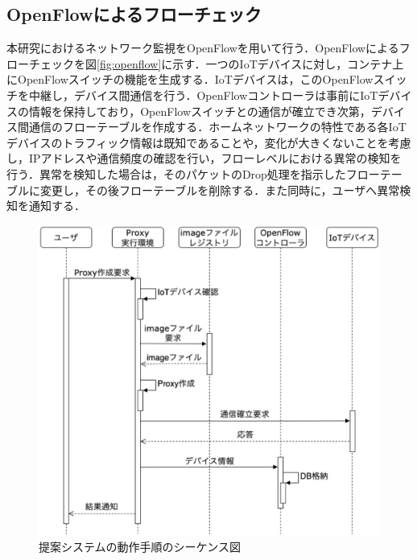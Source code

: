 \documentclass[Japanese]{dicomopapers}
\begin{document}
\subsection{OpenFlowによるフローチェック}
本研究におけるネットワーク監視をOpenFlowを用いて行う．OpenFlowによるフローチェックを図\ref{fig:openflow}に示す．一つのIoTデバイスに対し，コンテナ上にOpenFlowスイッチの機能を生成する．IoTデバイスは，このOpenFlowスイッチを中継し，デバイス間通信を行う．OpenFlowコントローラは事前にIoTデバイスの情報を保持しており，OpenFlowスイッチとの通信が確立でき次第，デバイス間通信のフローテーブルを作成する．ホームネットワークの特性である各IoTデバイスのトラフィック情報は既知であることや，変化が大きくないことを考慮し，IPアドレスや通信頻度の確認を行い，フローレベルにおける異常の検知を行う．異常を検知した場合は，そのパケットのDrop処理を指示したフローテーブルに変更し，その後フローテーブルを削除する．また同時に，ユーザへ異常検知を通知する．

\begin{figure}[!tb]
	\centering
	\includegraphics[width=\linewidth]{img/seaquence.eps}
	\caption{提案システムの動作手順のシーケンス図}
	\label{fig:seaquence}
\end{figure}
\end{document}
